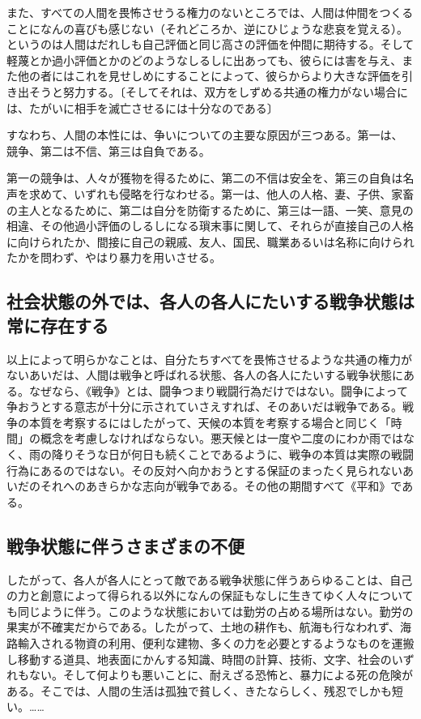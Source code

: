 また、すべての人間を畏怖させうる権力のないところでは、人間は仲間をつくることになんの喜びも感じない（それどころか、逆にひじょうな悲哀を覚える）。というのは人間はだれしも自己評価と同じ高さの評価を仲間に期待する。そして軽蔑とか過小評価とかのどのようなしるしに出あっても、彼らには害を与え、また他の者にはこれを見せしめにすることによって、彼らからより大きな評価を引き出そうと努力する。〔そしてそれは、双方をしずめる共通の権力がない場合には、たがいに相手を滅亡させるには十分なのである〕



すなわち、人間の本性には、争いについての主要な原因が三つある。第一は、
競争、第二は不信、第三は自負である。



第一の競争は、人々が獲物を得るために、第二の不信は安全を、第三の自負は名声を求めて、いずれも侵略を行なわせる。第一は、他人の人格、妻、子供、家畜の主人となるために、第二は自分を防衛するために、第三は一語、一笑、意見の相違、その他過小評価のしるしになる瑣末事に関して、それらが直接自己の人格に向けられたか、間接に自己の親戚、友人、国民、職業あるいは名称に向けられたかを問わず、やはり暴力を用いさせる。



\subsection{社会状態の外では、各人の各人にたいする戦争状態は常に存在する}


以上によって明らかなことは、自分たちすべてを畏怖させるような共通の権力がないあいだは、人間は戦争と呼ばれる状態、各人の各人にたいする戦争状態にある。なぜなら、《戦争》とは、闘争つまり戦闘行為だけではない。闘争によって争おうとする意志が十分に示されていさえすれば、そのあいだは戦争である。戦争の本質を考察するにはしたがって、天候の本質を考察する場合と同じく「時間」の概念を考慮しなければならない。悪天候とは一度や二度のにわか雨ではなく、雨の降りそうな日が何日も続くことであるように、戦争の本質は実際の戦闘行為にあるのではない。その反対へ向かおうとする保証のまったく見られないあいだのそれへのあきらかな志向が戦争である。その他の期間すべて《平和》である。



\subsection{戦争状態に伴うさまざまの不便}

したがって、各人が各人にとって敵である戦争状態に伴うあらゆることは、自己の力と創意によって得られる以外になんの保証もなしに生きてゆく人々についても同じように伴う。このような状態においては勤労の占める場所はない。勤労の果実が不確実だからである。したがって、土地の耕作も、航海も行なわれず、海路輸入される物資の利用、便利な建物、多くの力を必要とするようなものを運搬し移動する道具、地表面にかんする知識、時間の計算、技術、文字、社会のいずれもない。そして何よりも悪いことに、耐えざる恐怖と、暴力による死の危険がある。そこでは、人間の生活は孤独で貧しく、きたならしく、残忍でしかも短い。……



